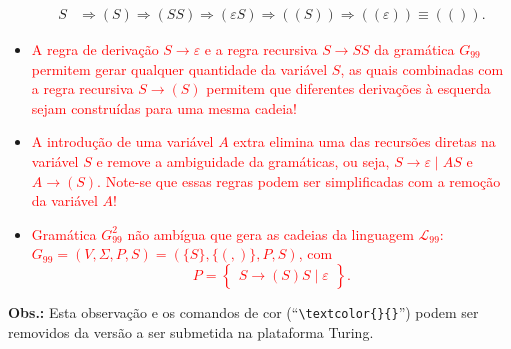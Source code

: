 \documentclass[12pt]{article}
\def\myling{{99}} %
\begin{document}
\begin{itemize}
{\begin{align*}
   S &\Rightarrow (S) \Rightarrow (SS) \Rightarrow (\varepsilon S) \Rightarrow ((S)) \Rightarrow  ((\varepsilon)) \equiv (()).
  \end{align*}
  \begin{center}
  \end{center}
  }
  \item \textcolor{red}{A regra de derivação $S\to \varepsilon$  e a regra recursiva $S\to SS$ da gramática $G_{\myling}$ permitem gerar qualquer quantidade da variável $S$, as quais combinadas com a regra recursiva $S\to (S)$ permitem que diferentes derivações à esquerda sejam construídas para uma mesma cadeia!
  }
  \item \textcolor{red}{A introdução de uma variável $A$ extra elimina uma das recursões diretas na variável $S$ e remove a ambiguidade da gramáticas, ou seja, $S\to \varepsilon \mid AS$ e $A\to (S)$. Note-se que essas regras podem ser simplificadas com a remoção da variável $A$!
  }
  \item  \textcolor{red}{Gramática $G^2_{\myling}$ não ambígua que gera as cadeias da linguagem $\mathcal{L}_{\myling}$:\\ $G_{\myling}=(V,\Sigma,P,S)=(\{S\},\{(,)\},P,S)$, com
  $$
   P =
   \left\{\begin{array}{l}
    S \to (S)S \mid \varepsilon
   \end{array}\right\}.
  $$
  }
\end{itemize}
%
%
\noindent\textbf{Obs.:} Esta observação e os comandos de cor (``\verb|\textcolor{}{}|'') podem ser removidos da versão a ser submetida na plataforma Turing.
\end{document}
